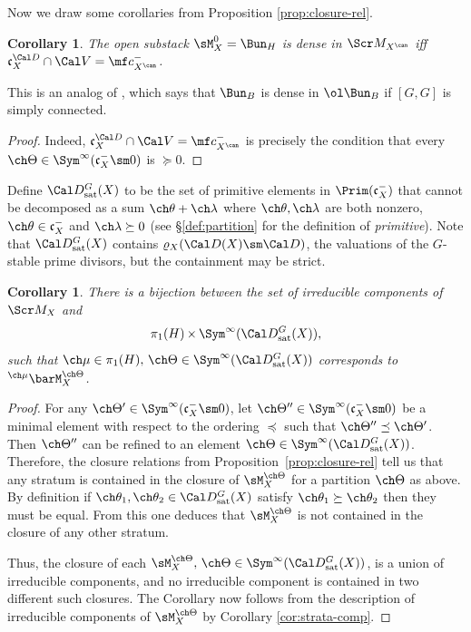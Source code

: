 \documentclass[final]{amsart}
\newtheorem{cor}[subsubsection]{Corollary}
\theoremstyle{remark}
\theoremstyle{definition}
\DeclareMathOperator*{\xt}{\times}
\numberwithin{equation}{section}
\begin{document}
Now we draw some corollaries from Proposition \ref{prop:closure-rel}.


\begin{cor}  \label{cor:can-comp}
The open substack $\sM_X^0 = \Bun_H$ is dense in $\Scr M_{X^\can}$ iff $\mathfrak c_X^{\Cal D} \cap \Cal V = \mf c_{X^\can}^-$. 
\end{cor}

This is an analog of \cite[Proposition 1.2.3]{BG}, which says that 
$\Bun_B$ is dense in $\ol\Bun_B$ if $[G,G]$ is simply connected. 

\begin{proof}
Indeed, $\mathfrak c_X^{\Cal D} \cap \Cal V = \mf c_{X^\can}^-$ is precisely the condition that every $\ch\Theta \in \Sym^\infty(\mathfrak c_X^- \sm 0)$ is $\succeq 0$.
\end{proof}


Define $\Cal D^G_{\mathrm{sat}}(X)$ to be 
the set of primitive elements in $\Prim(\mathfrak c_X^-)$ that
cannot be decomposed as a sum $\ch\theta+\ch\lambda$ where 
$\ch\theta,\ch\lambda$ are both nonzero, 
$\ch\theta \in \mathfrak c_X^-$
and $\ch\lambda \succeq 0$ (see \S\ref{def:partition} for 
the definition of \emph{primitive}). 
Note that $\Cal D^G_{\mathrm{sat}}(X)$ contains $\varrho_X(\Cal D(X)\sm \Cal D)$, 
the valuations of the $G$-stable prime divisors,
but the containment may be strict.



\begin{cor} \label{cor:comp}
 There is a bijection between the set of irreducible
components of $\Scr M_X$ and 
\[ \pi_1(H) \xt \Sym^\infty(\Cal D^G_{\mathrm{sat}}(X)), \] 
such that $\ch\mu \in \pi_1(H),\, \ch\Theta \in  \Sym^\infty(\Cal D^G_{\mathrm{sat}}(X))$ corresponds to 
$^{\ch\mu}\barM_X^{\ch\Theta}$.  
\end{cor}

\begin{proof}
 For any $\ch\Theta' \in \Sym^\infty(\mathfrak c_X^- \sm 0)$, 
let $\ch\Theta'' \in \Sym^\infty(\mathfrak c_X^-\sm 0)$ 
be a minimal element with respect to the ordering $\preceq$
such that $\ch\Theta'' \preceq \ch\Theta'$. 
Then $\ch\Theta''$ can be refined to an element $\ch\Theta\in \Sym^\infty(\Cal D^G_{\mathrm{sat}}(X))$. Therefore, the closure relations
from Proposition~\ref{prop:closure-rel} tell us that any stratum 
is contained in the closure of $\sM^{\ch\Theta}_X$ for a partition 
$\ch\Theta$ as above. 
By definition if $\ch\theta_1,\ch\theta_2\in \Cal D^G_{\mathrm{sat}}(X)$
satisfy $\ch\theta_1\succeq \ch\theta_2$ then they must be equal. 
From this one deduces that $\sM^{\ch\Theta}_X$ is not contained
in the closure of any other stratum. 

Thus, the closure of each
$\sM^{\ch\Theta}_X,\, \ch\Theta\in \Sym^\infty(\Cal D^G_{\mathrm{sat}}(X))$, 
is a union of irreducible components, and no irreducible component 
is contained in two different such closures. The Corollary now follows from the description of irreducible components of $\sM^{\ch\Theta}_X$ by Corollary \ref{cor:strata-comp}.
\end{proof}
\end{document}
